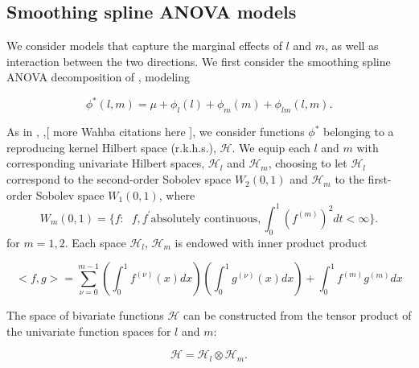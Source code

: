 \documentclass[12pt]{article}
\theoremstyle{definition}
\begin{document}
\subsection{Smoothing spline ANOVA models}

We consider models that capture the marginal effects of $l$ and $m$, as well as interaction between the two directions. We first consider the smoothing spline ANOVA decomposition of \citet{gu2002smoothing},  modeling 

\begin{equation}
\phi^*\left(l,m\right) = \mu + \phi_l\left(l\right) + \phi_m\left(m\right) + \phi_{lm}\left(l,m\right).   \label{eq:ANOVA}
\end{equation}
\noindent 

As in \citet{gu2002smoothing}, \citet{craven1978smoothing},[ more Wahba citations here ], we consider functions $\phi^*$ belonging to a reproducing kernel Hilbert space (r.k.h.s.), $\mathcal{H}$. We equip each $l$ and $m$  with corresponding univariate Hilbert spaces, $\mathcal{H}_l$ and $\mathcal{H}_m$, choosing to let $\mathcal{H}_l$ correspond to the second-order Sobolev space $W_2\left(0,1\right)$ and $\mathcal{H}_m$ to the first-order Sobolev space $W_1\left(0,1\right)$, where
\[
W_m\left(0,1\right) = \lbrace f: \;\;f, f^\prime \mbox{absolutely continuous}, \int_0^1 \left(f^{\left( m \right)}\right)^2 dt < \infty \rbrace.
\]
\noindent
for $m=1, 2$. Each space $\mathcal{H}_l$, $\mathcal{H}_m$ is endowed with inner product  product

\begin{equation} \label{eq:inner_product}
\big < f, g \big > = \sum_{\nu=0}^{m-1} \left( \int_0^1 f^{\left( \nu \right)}\left(x\right) dx \right)\left( \int_0^1 g^{\left( \nu \right)}\left(x\right) dx \right) + \int_0^1 f^{\left( m \right)} g^{\left( m \right)}dx
\end{equation}

 The space of bivariate functions $\mathcal{H}$ can be constructed from the tensor product of the univariate function spaces for $l$ and $m$:

\[
\mathcal{H} = \mathcal{H}_l \otimes \mathcal{H}_m.
\]
\noindent
\end{document}
